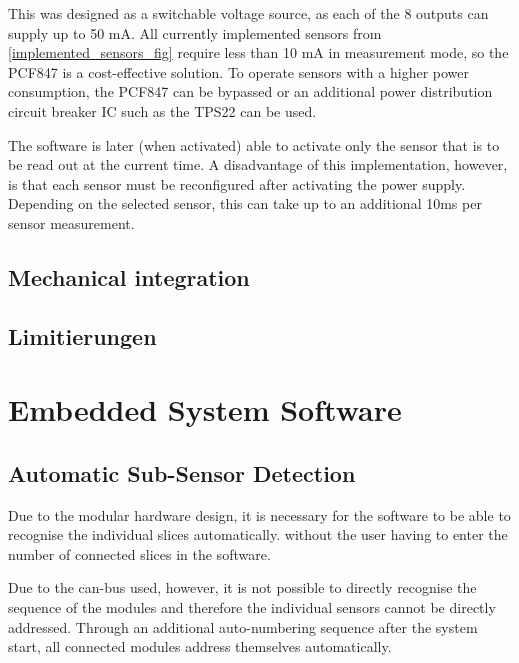 \documentclass[conference]{IEEEtran}
\begin{document}
This was designed as a switchable voltage source, as each of the 8 outputs can supply up to 50 mA.
All currently implemented sensors from \ref{implemented_sensors_fig} require less than 10 mA in measurement mode, so the PCF847 is a cost-effective solution.
To operate sensors with a higher power consumption, the PCF847 can be bypassed or an additional power distribution circuit breaker IC such as the TPS22 can be used.



The software is later (when activated) able to activate only the sensor that is to be read out at the current time.
A disadvantage of this implementation, however, is that each sensor must be reconfigured after activating the power supply.
Depending on the selected sensor, this can take up to an additional 10ms per sensor measurement.





\subsection{Mechanical integration}

%
\subsection{Limitierungen}


\section{Embedded System Software}

\subsection{Automatic Sub-Sensor Detection}

Due to the modular hardware design, it is necessary for the software to be able to recognise the individual slices automatically.
without the user having to enter the number of connected slices in the software.

Due to the can-bus used, however, it is not possible to directly recognise the sequence of the modules and therefore the individual sensors cannot be directly addressed.
Through an additional auto-numbering sequence after the system start, all connected modules address themselves automatically.
\end{document}
